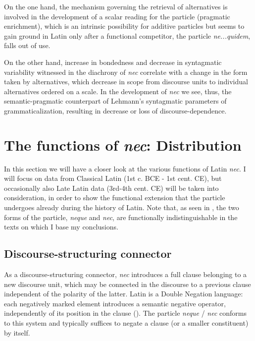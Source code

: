 \documentclass[output=paper,modfonts,nonflat,citecolor=brown,
showindex
]{langsci/langscibook}
\begin{document}
On the one hand, the mechanism governing the retrieval of alternatives is involved in the development of a scalar reading for the particle (pragmatic enrichment), which is an intrinsic possibility for additive particles but seems to gain ground in Latin only after a functional competitor, the particle {\emph{ne...quidem}}, falls out of use.  

On the other hand, increase in bondedness and decrease in syntagmatic variability witnessed in the diachrony of {\emph{nec}} correlate with a change in the form taken by alternatives, which decrease in scope from discourse units to individual alternatives ordered on a scale. In the development of {\emph{nec}} we see, thus, the semantic-pragmatic counterpart of Lehmann's syntagmatic parameters of grammaticalization, resulting in decrease or loss of discourse-dependence.  

\section{The functions of {\emph{nec}}: Distribution} \label{distributionfunctions}

In this section we will have a closer look at the various functions of Latin {\emph{nec}}. I will focus on data from Classical Latin (1st c. BCE - 1st cent. CE), but occasionally also Late Latin data (3rd-4th cent. CE) will be taken into consideration, in order to show the functional extension that the particle undergoes already during the history of Latin. Note that, as seen in , the two forms of the particle, {\emph{neque}} and {\emph{nec}}, are functionally indistinguishable in the texts on which I base my conclusions.

\subsection{Discourse-structuring connector}

As a discourse-structuring connector, {\emph{nec}} introduces a full clause belonging to a new discourse unit, which may be connected in the discourse to a previous clause independent of the polarity of the latter. Latin is a Double Negation language: each negatively marked element introduces a semantic negative operator, independently of its position in the clause (\citealt[]{Gianollo16}). The particle {\emph{neque}} / {\emph{nec}} conforms to this system and typically suffices to negate a clause (or a smaller constituent) by itself.
\end{document}
